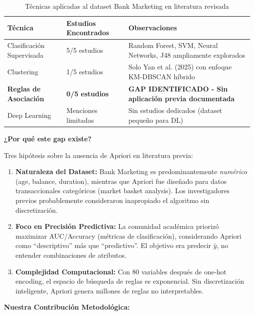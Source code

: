 \documentclass[12pt,letterpaper]{article}
\begin{document}
\begin{table}[H]
\centering
\caption{Técnicas aplicadas al dataset Bank Marketing en literatura revisada}
\label{tab:tecnicas_literatura}
\small
\begin{tabular}{@{}llp{6cm}@{}}
\toprule
\textbf{Técnica} & \textbf{Estudios Encontrados} & \textbf{Observaciones} \\
\midrule
Clasificación Supervisada & 5/5 estudios & Random Forest, SVM, Neural Networks, J48 ampliamente explorados \\
\addlinespace
Clustering & 1/5 estudios & Solo Yan et al. (2025) con enfoque KM-DBSCAN híbrido \\
\addlinespace
\textbf{Reglas de Asociación} & \textbf{0/5 estudios} & \textbf{GAP IDENTIFICADO - Sin aplicación previa documentada} \\
\addlinespace
Deep Learning & Menciones limitadas & Sin estudios dedicados (dataset pequeño para DL) \\
\bottomrule
\end{tabular}
\end{table}

\textbf{¿Por qué este gap existe?}

Tres hipótesis sobre la ausencia de Apriori en literatura previa:

\begin{enumerate}
    \item \textbf{Naturaleza del Dataset:} Bank Marketing es predominantemente \textit{numérico} (age, balance, duration), mientras que Apriori fue diseñado para datos transaccionales categóricos (market basket analysis). Los investigadores previos probablemente consideraron inapropiado el algoritmo sin discretización.
    
    \item \textbf{Foco en Precisión Predictiva:} La comunidad académica priorizó maximizar AUC/Accuracy (métricas de clasificación), considerando Apriori como ``descriptivo'' más que ``predictivo''. El objetivo era predecir $\hat{y}$, no entender combinaciones de atributos.
    
    \item \textbf{Complejidad Computacional:} Con 80 variables después de one-hot encoding, el espacio de búsqueda de reglas es exponencial. Sin discretización inteligente, Apriori genera millones de reglas no interpretables.
\end{enumerate}

\textbf{Nuestra Contribución Metodológica:}
\end{document}
